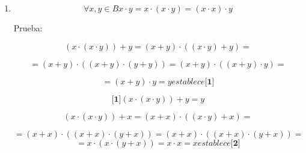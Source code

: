 \documentclass[
]{article}
\begin{document}
\begin{enumerate}
\begin{enumerate}
\begin{enumerate}
\begin{enumerate}
\begin{enumerate}
          \[{\lbrack\mathbf{1}\rbrack}{{{({x + {({x + y})}})} \cdot y} = y}\]

          \[{}{}{{{{({x + {({x + y})}})} \cdot x} = {{({x \cdot x})} + {({{({x + y})} \cdot x})}}} =}\]

          \[{}{{{= {{({x \cdot x})} + {({{x \cdot x} + {y \cdot x}})}}} = {{({x \cdot x})} + {({{x \cdot x} + x})}}} =}\]

          \[{}{{= {{({x \cdot x})} + x}} = x}{}{}{}\mathit{establece}{\lbrack\mathbf{2}\rbrack}\]

          \[{\lbrack\mathbf{2}\rbrack}{{{({x + {({x + y})}})} \cdot x} = x}\]

          \[\mathit{De}{\lbrack\mathbf{1}\rbrack}y\mathit{de}{\lbrack\mathbf{2}\rbrack}\mathit{obtenemos}:\]

          \[{{x + y} = {{\lbrack{{({x + {({x + y})}})} \cdot x}\rbrack} + {\lbrack{{({x + {({x + y})}})} \cdot y}\rbrack}}} =\]

          \[{{= {{({x + {({x + y})}})} \cdot {({x + y})}}} = {{({x + {({x + y})}})} \cdot {({{({x + y})} + {({x + y})}})}}} =\]

          \[{= {{({{({x + {({x + y})}})} \cdot {({x + y})}})} + {({{({x + {({x + y})}})} \cdot {({x + y})}})}}} =\]

          \[= {x + {({x + y})}}\]

          \[{{{({x + x})} + y} = {x + y}} = {x + {({x + y})}}\]
        \item
          \[\forall x,{y \in B}{{{x \cdot y} = {x \cdot {({x \cdot y})}}} = {{({x \cdot x})} \cdot y}}\]

          Prueba:

          \[{}{}{{{{({x \cdot {({x \cdot y})}})} + y} = {{({x + y})} \cdot {({{({x \cdot y})} + y})}}} =}\]

          \[{{= {{({x + y})} \cdot {({{({x + y})} \cdot {({y + y})}})}}} = {{({x + y})} \cdot {({{({x + y})} \cdot y})}}} = {}\]

          \[{{= {{({x + y})} \cdot y}} = y}{}{}{}\mathit{establece}{\lbrack\mathbf{1}\rbrack}\]

          \[{\lbrack\mathbf{1}\rbrack}{{{({x \cdot {({x \cdot y})}})} + y} = y}\]

          \[{}{}{{{{({x \cdot {({x \cdot y})}})} + x} = {{({x + x})} \cdot {({{({x \cdot y})} + x})}}} =}\]

          \[{{= {{({x + x})} \cdot {({{({x + x})} \cdot {({y + x})}})}}} = {{({x + x})} \cdot {({{({x + x})} \cdot {({y + x})}})}}} = {}\]\[{{{= {x \cdot {({x \cdot {({y + x})}})}}} = {x \cdot x}} = x}{}{}{}\mathit{establece}{\lbrack\mathbf{2}\rbrack}\]


\end{enumerate}
\end{enumerate}
\end{enumerate}
\end{enumerate}
\end{enumerate}
\end{document}

